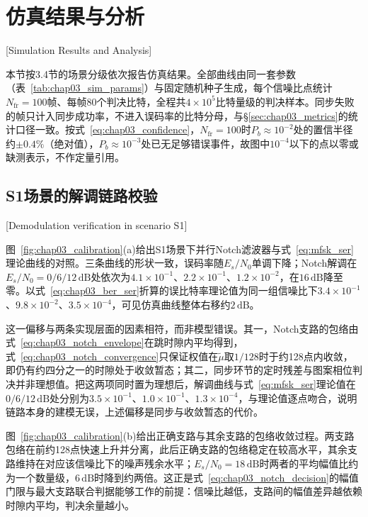\FloatBarrier

\section{仿真结果与分析}[Simulation Results and Analysis]
\label{sec:chap03_results}

本节按3.4节的场景分级依次报告仿真结果。全部曲线由同一套参数（表~\ref{tab:chap03_sim_params}）与固定随机种子生成，每个信噪比点统计$N_{\mathrm{fr}}=100$帧、每帧80个判决比特，全程共$4\times10^5$比特量级的判决样本。同步失败的帧只计入同步成功率，不进入误码率的比特分母，与\S\ref{sec:chap03_metrics}的统计口径一致。按式~\eqref{eq:chap03_confidence}，$N_{\mathrm{fr}}=100$时$P_b\approx10^{-2}$处的置信半径约$\pm0.4\%$（绝对值），$P_b\approx10^{-3}$处已无足够错误事件，故图中$10^{-4}$以下的点以零或缺测表示，不作定量引用。

\subsection{S1场景的解调链路校验}[Demodulation verification in scenario S1]

图~\ref{fig:chap03_calibration}(a)给出S1场景下并行Notch滤波器与式~\eqref{eq:mfsk_ser}理论曲线的对照。三条曲线的形状一致，误码率随$E_s/N_0$单调下降；Notch解调在$E_s/N_0=0/6/12\,\mathrm{dB}$处依次为$4.1\times10^{-1}$、$2.2\times10^{-1}$、$1.2\times10^{-2}$，在$16\,\mathrm{dB}$降至零。以式~\eqref{eq:chap03_ber_ser}折算的误比特率理论值为同一组信噪比下$3.4\times10^{-1}$、$9.8\times10^{-2}$、$3.5\times10^{-4}$，可见仿真曲线整体右移约$2\,\mathrm{dB}$。

这一偏移与两条实现层面的因素相符，而非模型错误。其一，Notch支路的包络由式~\eqref{eq:chap03_notch_envelope}在跳时隙内平均得到，式~\eqref{eq:chap03_notch_convergence}只保证权值在$\tilde\mu$取$1/128$时于约128点内收敛，即仍有约四分之一的时隙处于收敛暂态；其二，同步环节的定时残差与图案相位判决并非理想值。把这两项同时置为理想后，解调曲线与式~\eqref{eq:mfsk_ser}理论值在$0/6/12\,\mathrm{dB}$处分别为$3.5\times10^{-1}$、$1.0\times10^{-1}$、$1.3\times10^{-4}$，与理论值逐点吻合，说明链路本身的建模无误，上述偏移是同步与收敛暂态的代价。

图~\ref{fig:chap03_calibration}(b)给出正确支路与其余支路的包络收敛过程。两支路包络在前约128点快速上升并分离，此后正确支路的包络稳定在较高水平，其余支路维持在对应该信噪比下的噪声残余水平；$E_s/N_0=18\,\mathrm{dB}$时两者的平均幅值比约为一个数量级，$6\,\mathrm{dB}$时降到约两倍。这正是式~\eqref{eq:chap03_notch_decision}的幅值门限与最大支路联合判据能够工作的前提：信噪比越低，支路间的幅值差异越依赖时隙内平均，判决余量越小。

